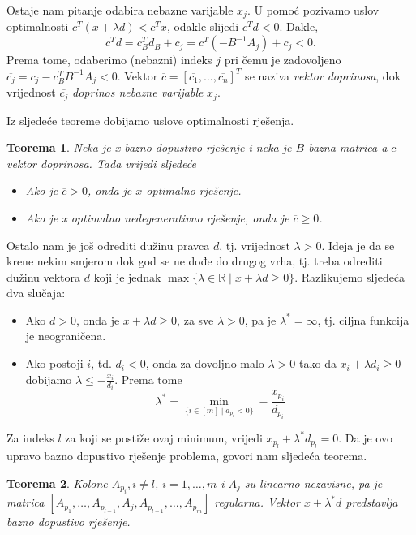 \documentclass[a4paper, utf8, 11pt, colorlinks]{book}
\newtheorem{thm}{Teorema}
\begin{document}
 Ostaje nam pitanje odabira nebazne varijable $x_j$. U pomoć pozivamo uslov optimalnosti $c^T ( x + \lambda d ) < c^T x $, odakle slijedi $c^T d < 0$.  Dakle, $$c^T d = c_B^T d_B + c_j = c^T ( - B^{-1} A_j ) + c_j < 0.$$
 Prema tome, odaberimo (nebazni) indeks $j$ pri čemu je zadovoljeno $ \overline{c_j} = c_j - c_B^T B^{-1}A_j < 0$. Vektor $\overline{c}=[\overline{c_1}, \ldots, \overline{c_n}]^T$ se naziva \emph{vektor doprinosa}, dok vrijednost $\overline{c_j}$ \emph{doprinos nebazne varijable} $x_j$. 
 
Iz sljedeće teoreme dobijamo uslove optimalnosti rješenja.

\begin{thm}
  Neka je x bazno dopustivo rješenje i neka je $B$ bazna matrica a $\overline{c}$ vektor doprinosa. Tada vrijedi sljedeće
  \begin{itemize}
      \item Ako je $\overline{c} >0$, onda je $x$ optimalno rješenje.
      \item Ako je x optimalno nedegenerativno rješenje, onda je $\overline{c} \geq 0$.
  \end{itemize}
\end{thm}

Ostalo nam je još odrediti dužinu   pravca $d$, tj. vrijednost $\lambda>0$. Ideja je da se krene nekim smjerom dok god se ne dođe do drugog vrha, tj. treba odrediti dužinu vektora $d$ koji je jednak $\max \{ \lambda \in \mathbb{R} \mid x + \lambda d \geq 0 \}$. Razlikujemo sljedeća dva slučaja:
\begin{itemize}
    \item Ako $d >0$, onda je $  x + \lambda d \geq 0$, za sve $\lambda > 0$, pa je $\lambda^* = \infty$, tj. ciljna funkcija je neograničena.
    \item Ako postoji $i$, td. $d_i < 0$, onda za dovoljno malo $\lambda>0$ tako da $x_i + \lambda d_i \geq 0$ dobijamo $\lambda \leq -\frac{x_i}{d_i}$. Prema tome 
    $$ \lambda^* = \min_{ \{i\in [m] \mid d_{p_i} < 0  \}} - \frac{x_{p_i}}{d_{p_i}} $$
\end{itemize}
Za indeks $l$ za koji se postiže ovaj minimum, vrijedi $x_{p_l} + \lambda^* d_{p_l}=0$.
Da je ovo upravo bazno dopustivo rješenje problema, govori nam sljedeća teorema. 
\begin{thm}
    Kolone $A_{p_i}, i\not = l$, $i=1,\ldots,m$ i $A_{j}$ su linearno nezavisne, pa je matrica 
    $[A_{p_1},\ldots, A_{p_{l-1}}, A_j, A_{p_{l+1}}, \ldots, A_{p_m}]$
    regularna. Vektor $x + \lambda^* d$ predstavlja bazno dopustivo rješenje. 
\end{thm}
\end{document}

